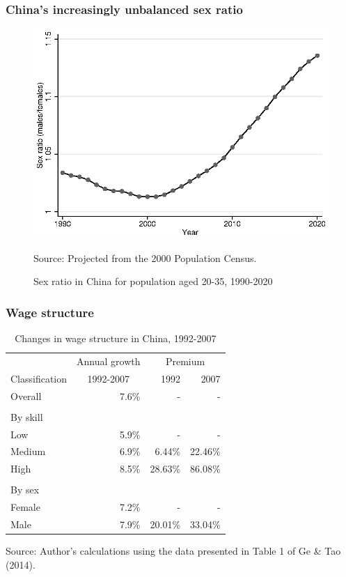 \documentclass{beamer}
\newcommand{\source}[1]{\caption*{Source: {#1}} }
\begin{document}
\begin{frame}[noframenumbering]
	\frametitle{China's increasingly unbalanced sex ratio}\label{slide:sex_ratio_20_35}
	\begin{figure}[]
		\centering
		\caption{Sex ratio in China for population aged 20-35, 1990-2020}
		\includegraphics[width=.6\textwidth]{sex_ratio_20_35}
		\source{Projected from the 2000 Population Census.}
	\end{figure}
	\hyperlink{slide:sex_ratio_birth}{}
\end{frame}

\begin{frame}
	\scriptsize
	\frametitle{Wage structure}\label{appendix:wage_struct}
	\begin{table}[htbp]
		\centering
		\caption{Changes in wage structure in China, 1992-2007}
		\begin{tabular}{lrrr}
			\toprule
			& \multicolumn{1}{c}{Annual growth} & \multicolumn{2}{c}{Premium} \\
			\cmidrule{3-4}Classification & \multicolumn{1}{c}{1992-2007} & 1992  & 2007 \\
			\midrule
			Overall & 7.6\% &   -    & - \\
			&       &       &  \\
			By skill &       &       &  \\
			Low   & 5.9\% &   -    & - \\
			Medium & 6.9\% & 6.44\% & 22.46\% \\
			High  & 8.5\% & 28.63\% & 86.08\% \\
			&       &       &  \\
			By sex &       &       &  \\
			Female & 7.2\% &   -    & - \\
			Male  & 7.9\% & 20.01\% & 33.04\% \\
			\bottomrule
			\bottomrule
		\end{tabular}
		\source{Author's calculations using the data presented in Table 1 of Ge \& Tao (2014).}
	\end{table}
	\hyperlink{appendix:skill_premium_chns}{}
	\hyperlink{appendix:gender_wage_ratio_chns}{}
\end{frame}
\end{document}
